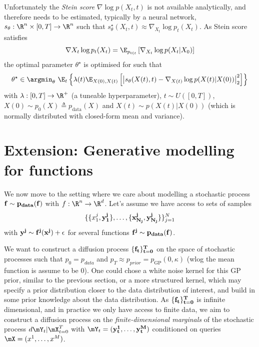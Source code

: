 Unfortunately the \emph{Stein score} $\nabla \log p(X_t, t)$ is not available analytically, and therefore needs to be estimated, typically by a neural network, $s_\theta: \R^n \times [0,T] \rightarrow \R^n$ such that $s_\theta^\star(X_t, t) \approx \nabla_{X_t} \log p_t(X_t)$.
As Stein score satisfies
\begin{align}
\nabla{X_t} \log p_t(X_t) = \E_{p_{0|t}}\left[ \nabla_{X_t} \log p(X_t|X_0) \right]
\end{align}
the optimal parameter $\theta^\star$ is optimised for such that
%
\begin{align}
\theta^\star \in \argmin_\theta ~\E_t \left\{ \lambda(t) \E_{X(0), X(t)} \left[ \left| s_\theta(X(t),t) - \nabla_{X(t)} \log p(X(t)|X(0))\right|^2_2  \right] \right\}
\end{align}
with $\lambda: [0,T] \rightarrow \R^+$ (a tuneable hyperparameter), $t \sim U([0, T])$, $X(0) \sim p_0(X) \triangleq p_{\text{data}}(X)$ and $X(t) \sim p(X(t)|X(0))$ (which is normally distributed with closed-form mean and variance).

\section{Extension: Generative modelling for functions}

We now move to the setting where we care about modelling a stochastic process $\bf{f} \sim p_{data}(\bf{f})$ with $f: \R^n \rightarrow \R^d$.
Let's assume we have access to sets of  samples 
\begin{align}
    { \{ \{x_1^j, \bf{y}_1^j\}, \dots,  \{x_{N_j}^j, \bf{y}_{N_j}^j}\} \}_{j=1}^N    
\end{align}
with $\bf{y}^j \sim f^j(x^j) + \bf{\epsilon}$ for several functions $\bf{f}^j \sim p_{data}(\bf{f})$.

We want to construct a diffusion process $\{\bf{f}_t\}_{t=0}^T$ on the space of stochastic processes such that $p_0=p_{data}$ and $p_T \approx p_{prior} = p_{\text{GP}}(0, \kappa)$ (wlog the mean function is assume to be 0). One could chose a white noise kernel for this GP prior, similar to the previous section, or a more structured kernel, which may specify a prior distribution closer to the data distribution of interest, and build in some prior knowledge about the data distribution.
As $\{\bf{f}_t\}_{t=0}^T$ is infinite dimensional, and in practice we only have access to finite data, we aim to construct a diffusion process on the \emph{finite-dimensional marginals} of the stochastic process $d\mY_t|\mX_{t=0}^T$ with $\mY_t = (\bf{y}_t^1, \dots, \bf{y}_t^M)$ conditioned on queries $\mX = (x^1, \dots, x^M)$. %

